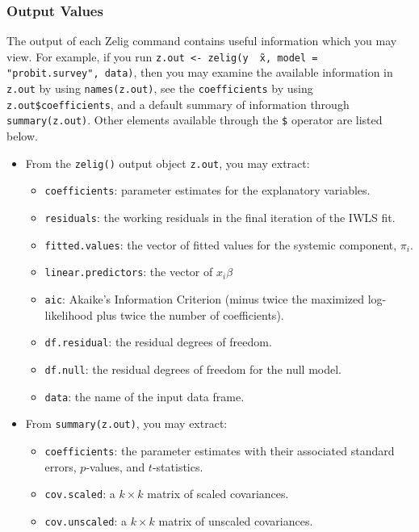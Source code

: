 \subsubsection{Output Values}

The output of each Zelig command contains useful information which you
may view.  For example, if you run \texttt{z.out <- zelig(y \~\ x,
  model = "probit.survey", data)}, then you may examine the available
information in \texttt{z.out} by using \texttt{names(z.out)},
see the {\tt coefficients} by using {\tt z.out\$coefficients}, and
a default summary of information through \texttt{summary(z.out)}.
Other elements available through the {\tt \$} operator are listed
below.

\begin{itemize}
\item From the {\tt zelig()} output object {\tt z.out}, you may
  extract:
   \begin{itemize}
   \item {\tt coefficients}: parameter estimates for the explanatory
     variables.
   \item {\tt residuals}: the working residuals in the final iteration
     of the IWLS fit.
   \item {\tt fitted.values}: the vector of fitted values for the
     systemic component, $\pi_i$.
   \item {\tt linear.predictors}: the vector of $x_{i}\beta$
   \item {\tt aic}: Akaike's Information Criterion (minus twice the
     maximized log-likelihood plus twice the number of coefficients).
   \item {\tt df.residual}: the residual degrees of freedom.
   \item {\tt df.null}: the residual degrees of freedom for the null
     model.
   \item {\tt data}: the name of the input data frame.  
   \end{itemize}

\item From {\tt summary(z.out)}, you may extract: 
   \begin{itemize}
   \item {\tt coefficients}: the parameter estimates with their
     associated standard errors, $p$-values, and $t$-statistics.
   \item{\tt cov.scaled}: a $k \times k$ matrix of scaled covariances.
   \item{\tt cov.unscaled}: a $k \times k$ matrix of unscaled
     covariances.  
   \end{itemize}


\end{itemize}
